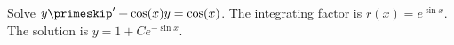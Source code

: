 {Solve $y\primeskip' + \cos (x) y = \cos(x)$.}
{The integrating factor is $r(x)=e^{\sin x}$.\\
The solution is $y=1+Ce^{-\sin x}$.}
